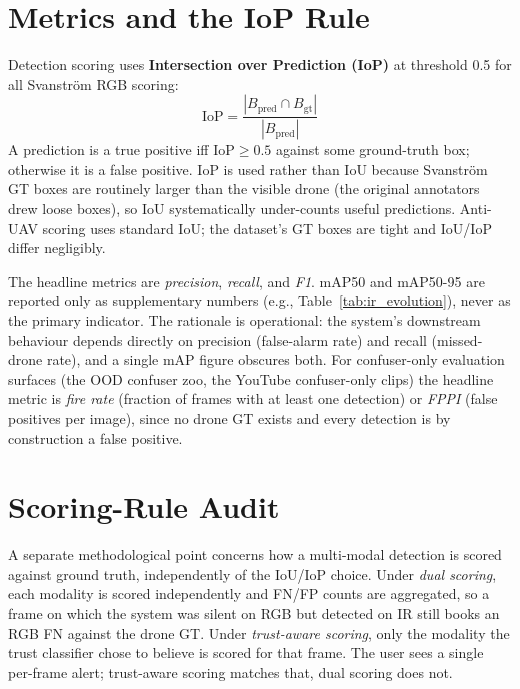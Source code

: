 \documentclass[12pt,a4paper,oneside,openright]{book}
\begin{document}
\section{Metrics and the IoP Rule}
\label{sec:metrics}

Detection scoring uses \textbf{Intersection over Prediction (IoP)} at threshold 0.5 for all Svanstr\"om RGB scoring:
\[
\text{IoP} = \frac{|B_\text{pred} \cap B_\text{gt}|}{|B_\text{pred}|}
\]
A prediction is a true positive iff $\text{IoP} \geq 0.5$ against some ground-truth box; otherwise it is a false positive. IoP is used rather than IoU because Svanstr\"om GT boxes are routinely larger than the visible drone (the original annotators drew loose boxes), so IoU systematically under-counts useful predictions. Anti-UAV scoring uses standard IoU; the dataset's GT boxes are tight and IoU/IoP differ negligibly.

The headline metrics are \emph{precision}, \emph{recall}, and \emph{F1}. mAP50 and mAP50-95 are reported only as supplementary numbers (e.g., Table~\ref{tab:ir_evolution}), never as the primary indicator. The rationale is operational: the system's downstream behaviour depends directly on precision (false-alarm rate) and recall (missed-drone rate), and a single mAP figure obscures both. For confuser-only evaluation surfaces (the OOD confuser zoo, the YouTube confuser-only clips) the headline metric is \emph{fire rate} (fraction of frames with at least one detection) or \emph{FPPI} (false positives per image), since no drone GT exists and every detection is by construction a false positive.

\section{Scoring-Rule Audit}
\label{sec:scoring_audit}

A separate methodological point concerns how a multi-modal detection is scored against ground truth, independently of the IoU/IoP choice. Under \emph{dual scoring}, each modality is scored independently and FN/FP counts are aggregated, so a frame on which the system was silent on RGB but detected on IR still books an RGB FN against the drone GT. Under \emph{trust-aware scoring}, only the modality the trust classifier chose to believe is scored for that frame. The user sees a single per-frame alert; trust-aware scoring matches that, dual scoring does not.
\end{document}
